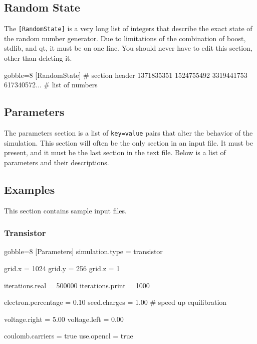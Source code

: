 \subsection{Random State}
    \label{ssec:random}
    The \verb|[RandomState]| is a very long list of integers that
        describe the exact state of the random number generator.
    Due to limitations of the combination of boost, stdlib, and qt,
        it must be on one line.
    You should never have to edit this section, other than deleting it.

    \begin{bashcode*}{gobble=8}
        [RandomState] # section header
        1371835351 1524755492 3319441753 617340572... # list of numbers
    \end{bashcode*}

\newpage
\subsection{Parameters}
    \label{ssec:parameters}
    The parameters section is a list of \verb|key=value| pairs that
        alter the behavior of the simulation.
    This section will often be the only section in an input file.
    It must be present, and it must be the last section in the text
        file.
    Below is a list of parameters and their descriptions.
    
    

\newpage
\subsection{Examples}
    \label{ssec:examples}
    This section contains sample input files.

    \subsubsection{Transistor}
    \begin{bashcode*}{gobble=8}
        [Parameters]
        simulation.type         = transistor

        grid.x                  = 1024
        grid.y                  = 256
        grid.z                  = 1

        iterations.real         = 500000
        iterations.print        = 1000

        electron.percentage     = 0.10
        seed.charges            = 1.00      # speed up equilibration

        voltage.right           = 5.00
        voltage.left            = 0.00

        coulomb.carriers        = true
        use.opencl              = true
    \end{bashcode*}

